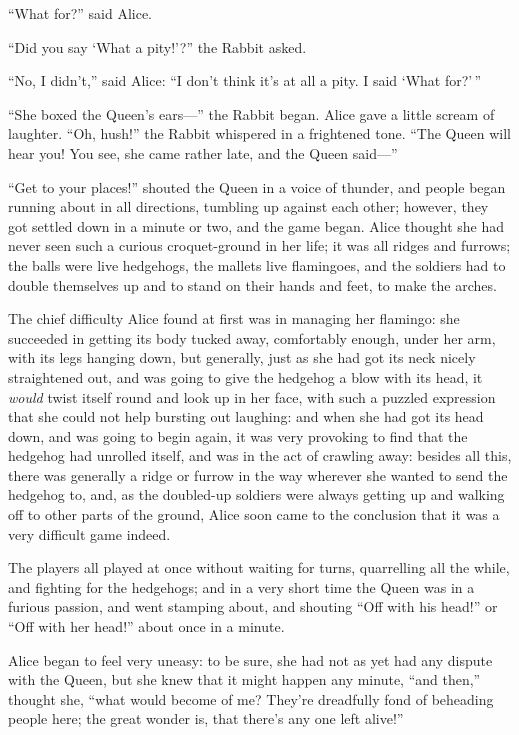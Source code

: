 \documentclass[book, 20pt]{extbook}
\begin{document}
``What for?'' said Alice.

``Did you say `What a pity!'?'' the Rabbit asked.

``No, I didn't,'' said Alice: ``I don't think it's at all a pity. I said
`What for?'\,''

``She boxed the Queen's ears---'' the Rabbit began. Alice gave a little
scream of laughter. ``Oh, hush!'' the Rabbit whispered in a frightened
tone. ``The Queen will hear you! You see, she came rather late, and the
Queen said---''

``Get to your places!'' shouted the Queen in a voice of thunder, and
people began running about in all directions, tumbling up against each
other; however, they got settled down in a minute or two, and the game
began. Alice thought she had never seen such a curious croquet-ground in
her life; it was all ridges and furrows; the balls were live hedgehogs,
the mallets live flamingoes, and the soldiers had to double themselves
up and to stand on their hands and feet, to make the arches.

The chief difficulty Alice found at first was in managing her flamingo:
she succeeded in getting its body tucked away, comfortably enough, under
her arm, with its legs hanging down, but generally, just as she had got
its neck nicely straightened out, and was going to give the hedgehog a
blow with its head, it \emph{would} twist itself round and look up in
her face, with such a puzzled expression that she could not help
bursting out laughing: and when she had got its head down, and was going
to begin again, it was very provoking to find that the hedgehog had
unrolled itself, and was in the act of crawling away: besides all this,
there was generally a ridge or furrow in the way wherever she wanted to
send the hedgehog to, and, as the doubled-up soldiers were always
getting up and walking off to other parts of the ground, Alice soon came
to the conclusion that it was a very difficult game indeed.

The players all played at once without waiting for turns, quarrelling
all the while, and fighting for the hedgehogs; and in a very short time
the Queen was in a furious passion, and went stamping about, and
shouting ``Off with his head!'' or ``Off with her head!'' about once in
a minute.

Alice began to feel very uneasy: to be sure, she had not as yet had any
dispute with the Queen, but she knew that it might happen any minute,
``and then,'' thought she, ``what would become of me? They're dreadfully
fond of beheading people here; the great wonder is, that there's any one
left alive!''
\end{document}
